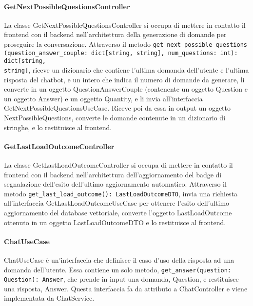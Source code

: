 \paragraph{GetNextPossibleQuestionsController}
\label{sec:get_next_possible_questions_controller}
La classe GetNextPossibleQuestionsController si occupa di mettere in contatto il frontend con il backend nell'architettura della generazione di domande per proseguire la conversazione. Attraverso il metodo \texttt{get\_next\_possible\_questions\\(question\_answer\_couple: dict[string, string], num\_questions: int): dict[string,\\ string]}, riceve un dizionario che contiene l'ultima domanda dell'utente e l'ultima risposta del chatbot, e un intero che indica il numero di domande da generare, li converte in un oggetto QuestionAnswerCouple (contenente un oggetto Question e un oggetto Answer) e un oggetto Quantity, e li invia all'interfaccia GetNextPossibleQuestionsUseCase. Riceve poi da essa in output un oggetto NextPossibleQuestions, converte le domande contenute in un dizionario di stringhe, e lo restituisce al frontend.

\paragraph{GetLastLoadOutcomeController}
\label{sec:get_last_load_outcome_controller}
La classe GetLastLoadOutcomeController si occupa di mettere in contatto il frontend con il backend nell'architettura dell'aggiornamento del badge di segnalazione dell'esito dell'ultimo aggiornamento automatico. Attraverso il metodo \texttt{get\_last\_load\_outcome(): LastLoadOutcomeDTO}, invia una richiesta all'interfaccia GetLastLoadOutcomeUseCase per ottenere l'esito dell'ultimo aggiornamento del database vettoriale, converte l'oggetto LastLoadOutcome ottenuto in un oggetto LastLoadOutcomeDTO e lo restituisce al frontend.

\newpage


\label{sec:use_case}

\paragraph{ChatUseCase}
\label{sec:chat_use_case}
ChatUseCase è un'interfaccia che definisce il caso d'uso della risposta ad una domanda dell'utente. Essa contiene un solo metodo, \texttt{get\_answer(question: Question): Answer}, che prende in input una domanda, Question, e restituisce una risposta, Answer. Questa interfaccia fa da attributo a ChatController e viene implementata da ChatService.

